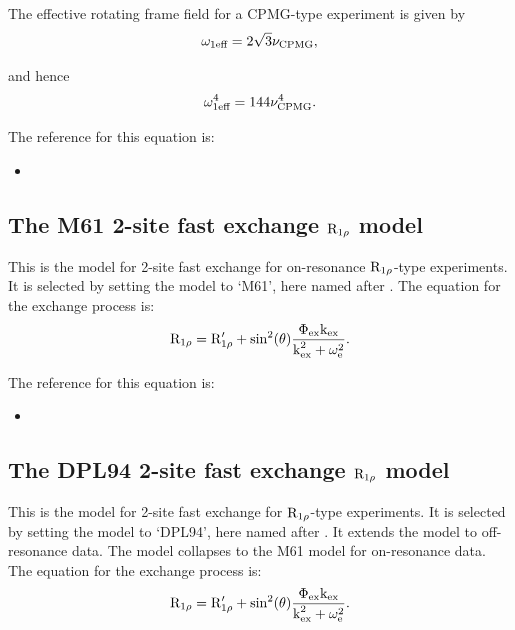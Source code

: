 The effective rotating frame field for a CPMG-type experiment is given by
\begin{equation}
    \omega_\textrm{1eff} = 2\sqrt{3}\nu_\textrm{CPMG} ,
\end{equation}

and hence
\begin{equation}
    \omega_\textrm{1eff}^4 = 144\nu_\textrm{CPMG}^4 .
\end{equation}

The reference for this equation is:
\begin{itemize}
\item {}
\end{itemize}



\subsection{The M61 2-site fast exchange $\mathrm{R}_{1\rho}$ model}

This is the model for 2-site fast exchange for on-resonance $\mathrm{R}_{1\rho}$-type experiments.  It is selected by setting the model to `M61', here named after \citet{Meiboom61}.  The equation for the exchange process is:
\begin{equation}
    \mathrm{R}_{1\rho} = \mathrm{R}_{1\rho}' + \sin^2(\theta) \frac{\Phi_\textrm{ex}\textrm{k}_\textrm{ex}}{\textrm{k}_\textrm{ex}^2 + \omega_\textrm{e}^2} .
\end{equation}

The reference for this equation is:
\begin{itemize}
\item {}
\end{itemize}



\subsection{The DPL94 2-site fast exchange $\mathrm{R}_{1\rho}$ model}

This is the model for 2-site fast exchange for $\mathrm{R}_{1\rho}$-type experiments.  It is selected by setting the model to `DPL94', here named after \citet{Davis94}.  It extends the \citet{Meiboom61} model to off-resonance data.  The model collapses to the M61 model for on-resonance data.  The equation for the exchange process is:
\begin{equation}
    \mathrm{R}_{1\rho} = \mathrm{R}_{1\rho}' + \sin^2(\theta) \frac{\Phi_\textrm{ex}\textrm{k}_\textrm{ex}}{\textrm{k}_\textrm{ex}^2 + \omega_\textrm{e}^2} .
\end{equation}


